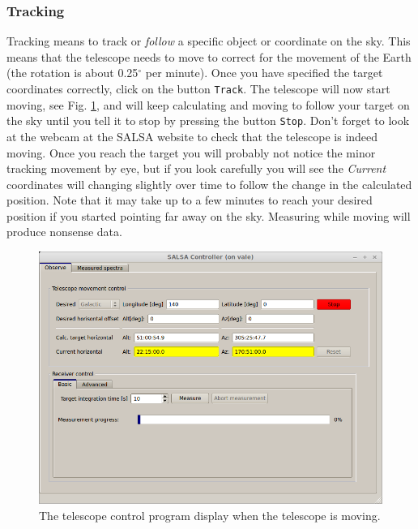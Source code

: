 \subsubsection{Tracking}
Tracking means to track or \emph{follow} a specific object or coordinate on the
sky. This means that the telescope needs to move to correct for the movement of
the Earth (the rotation is about 0.25$^\circ$ per minute). Once you have
specified the target coordinates correctly, click on the button {\tt Track}.
The telescope will now start moving, see Fig. \ref{fig:controlmove}, and will
keep calculating and moving to follow your target on the sky until you tell it
to stop by pressing the button {\tt Stop}.  Don't forget to look at the webcam
at the SALSA website to check that the telescope is indeed moving.  Once you
reach the target you will probably not notice the minor tracking movement by
eye, but if you look carefully you will see the \emph{Current} coordinates will
changing slightly over time to follow the change in the calculated position.
Note that it may take up to a few minutes to reach your desired position if you
started pointing far away on the sky. Measuring while moving will produce
nonsense data.  
\begin{figure}[ht]
\begin{center}
\includegraphics[width=\textwidth]{../figures/Controller_move.png}
\end{center}
\caption{The telescope control program display when the telescope is moving.}
\label{fig:controlmove}
\end{figure}

